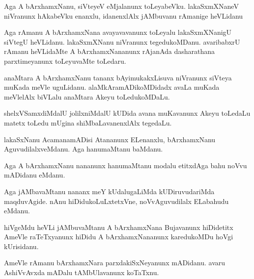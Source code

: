\documentclass{article}
\begin{document}
\begin{mn}
Aga  A  bArxhamxNanu,  siVteyeV  eMjalanunx  toLeyabeVku.  lakaSxmXNaneV  niVranunx  hAkabeVku  enanxlu,  idanenxlAlx  jAMbuvanu  rAmanige  heVLidanu
\end{mn}

\begin{mn}
Aga  rAmanu  A  bArxhamxNana  avayavavanunx  toLeyalu  lakaSxmXNanigU  siVtegU  heVLidanu.  lakaSxmXNanu  niVranunx  tegedukoMDanu.  avaribabxrU  
rAmanu  heVLidaMte  A  bArxhamxNananunx  rAjanAda  dasharathana  parxtimeyanunx  toLeyuvaMte  toLedaru.
\end{mn}

\begin{mn}
anaMtara  A  bArxhamxNanu  tananx  bAyimukakxLisuva  niVranunx  siVteya  muKada  meVle  uguLidanu.  alaMkAramADikoMDidadx  avaLa  muKada  
meVlelAlx  biVLalu  anaMtara  Akeyu  toLedukoMDaLu.
\end{mn}

\begin{mn}
shelxVSamxdiMdalU  jolilxniMdalU  kUDida  avana  muKavanunx  Akeyu  toLedaLu  matetx  toLedu  mUgina  shiMbaLavanenxlAlx  tegedaLu.
\end{mn}

\begin{mn}
lakaSxNanu  AcamanamADisi  Atananunx  ELenanxlu,  bArxhamxNanu  AguvudilalxveMdanu.  Aga  hanumaMtanu  baMdanu.
\end{mn}

\begin{mn}
Aga  A  bArxhamxNanu  nananunx  hanumaMtanu  modalu  etitxdAga  bahu  noVvu  mADidanu  eMdanu.
\end{mn}

\begin{mn}
Aga  jAMbavaMtanu  nananx  meY  kUdalugaLiMda  kUDiruvudariMda  maqduvAgide.  nAnu  hiDidukoLuLxtetxVne,  noVvAguvudilalx  
ELabahudu  eMdanu.
\end{mn}

\begin{mn}
hiVgeMdu  heVLi  jAMbuvaMtanu  A  bArxhamxNana  Bujavanunx  hiDidetitx  AmeVle  raTeTxyanunx  hiDidu  A  bArxhamxNananunx  
karedukoMDu  hoVgi  kUrisidanu.
\end{mn}

\begin{mn}
AmeVle  rAmanu  bArxhamxNara  parxdakiSxNeyanunx  mADidanu.  avaru  AshiVvAvxda  mADalu  tAMbUlavanunx  koTaTxnu.
\end{mn}
\end{document}
